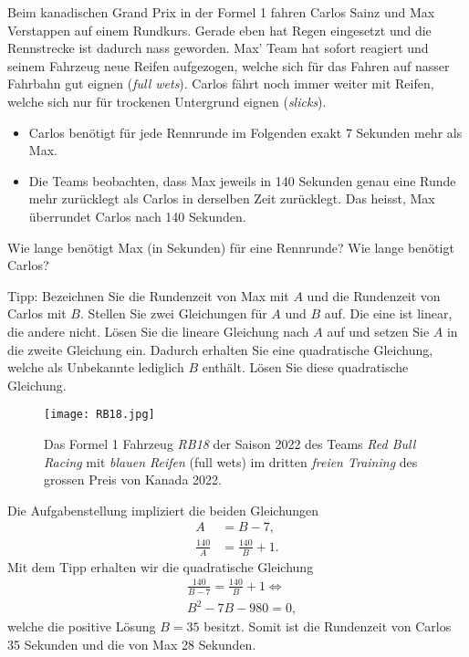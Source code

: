 \begin{questions}
\question[2] Beim kanadischen Grand Prix in der Formel 1 fahren Carlos Sainz und Max Verstappen auf einem Rundkurs. Gerade eben hat Regen eingesetzt und die Rennstrecke ist dadurch nass geworden. Max' Team hat sofort reagiert und seinem Fahrzeug neue Reifen aufgezogen, welche sich für das Fahren auf nasser Fahrbahn gut eignen (\textit{full wets}). Carlos fährt noch immer weiter mit Reifen, welche sich nur für trockenen Untergrund eignen (\textit{slicks}).
\begin{itemize}
    \item Carlos benötigt für jede Rennrunde im Folgenden exakt 7 Sekunden mehr als Max.
    \item Die Teams beobachten, dass Max jeweils in 140 Sekunden genau eine Runde mehr zurücklegt als Carlos in derselben Zeit zurücklegt. Das heisst, Max überrundet Carlos nach 140 Sekunden.
\end{itemize}
Wie lange benötigt Max (in Sekunden) für eine Rennrunde? Wie lange benötigt Carlos?

\noindent
Tipp: Bezeichnen Sie die Rundenzeit von Max mit $A$ und die Rundenzeit von Carlos mit $B$. Stellen Sie zwei Gleichungen für $A$ und $B$ auf. Die eine ist linear, die andere nicht. Lösen Sie die lineare Gleichung nach $A$ auf und setzen Sie $A$ in die zweite Gleichung ein. Dadurch erhalten Sie eine quadratische Gleichung, welche als Unbekannte lediglich $B$ enthält. Lösen Sie diese quadratische Gleichung.

\begin{figure}[H]
    \centering
    \texttt{[image: RB18.jpg]}
    \caption{Das Formel 1 Fahrzeug \textit{RB18} der Saison 2022 des Teams \textit{Red Bull Racing} mit \textit{blauen Reifen} (full wets) im dritten \textit{freien Training} des grossen Preis von Kanada 2022.}
    \label{fig:RB18}
\end{figure}
\begin{solution}
Die Aufgabenstellung impliziert die beiden Gleichungen
\begin{align*}
    A &= B - 7, \\
    \frac{140}{A} &= \frac{140}{B} + 1.
\end{align*}
Mit dem Tipp erhalten wir die quadratische Gleichung
\begin{align*}
    &\frac{140}{B-7} = \frac{140}{B} + 1 \iff \\
    &B^2 - 7B - 980 = 0,
    \end{align*}
welche die positive Lösung $B = 35$ besitzt. Somit ist die Rundenzeit von Carlos 35 Sekunden und die von Max 28 Sekunden.
\end{solution}


\end{questions}
